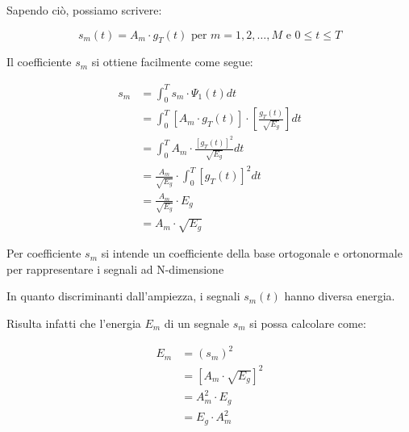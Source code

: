 Sapendo ciò, possiamo scrivere: 

{
    \Large 
    \begin{equation}
        s_m (t)
        = 
        A_m \cdot g_T (t) \text{ per } m = 1, 2, \dots, M \text{ e } 0 \le t \le T
    \end{equation}

}

Il coefficiente $s_m$ si ottiene facilmente come segue: 

{
    \Large 
    \begin{equation}
        \begin{split}
            s_m 
            &= 
            \int_{0}^{T}
            s_m \cdot \Psi_1 (t) dt
            \\
            &= 
            \int_{0}^{T}
            \left[A_m \cdot g_T (t) \right] 
            \cdot 
            \left[ \frac{g_T (t)}{\sqrt{E_g}}\right]
            dt
            \\
            &=
            \int_{0}^{T}
            A_m \cdot \frac{\left[g_T (t) \right]^{2}}{\sqrt{E_g}} dt
            \\
            &=
            \frac{A_m}{\sqrt{E_g}}
            \cdot 
            \int_{0}^{T}
            \left[g_T (t) \right]^{2}
            dt
            \\
            &=
            \frac{A_m}{\sqrt{E_g}}
            \cdot
            E_g
            \\
            &= 
            A_m \cdot \sqrt{E_g} 
        \end{split}
    \end{equation}
}

\begin{tcolorbox}

    Per coefficiente $s_m$ si intende un coefficiente della base ortogonale e ortonormale per rappresentare i segnali ad N-dimensione

\end{tcolorbox}

In quanto discriminanti dall'ampiezza, 
i segnali $s_m (t)$ hanno diversa energia. \newline 

Risulta infatti che l'energia $E_m$ di un segnale $s_m$ si possa calcolare come: 

{
    \Large 
    \begin{equation}
        \begin{split}
            E_m 
            &= 
            (s_m)^{2}
            \\
            &= 
            \left[ A_m \cdot \sqrt{E_g} \right]^{2}
            \\
            &= 
            A_m ^{2} \cdot E_g 
            \\
            &= 
            E_g \cdot A_m ^{2}   
        \end{split}
    \end{equation}
}

